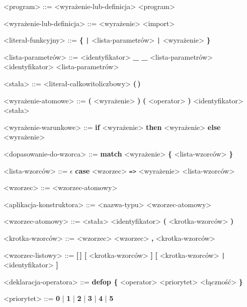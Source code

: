 \documentclass[12pt]{article}
\begin{document}
\begin{grammar}

<program> ::=
    <wyrażenie-lub-definicja>
     <program>

<wyrażenie-lub-definicja> ::=
    <wyrażenie>
    \alt <import>

<literał-funkcyjny> ::=
    \textbf{\{} \texttt{|} <lista-parametrów> \texttt{|} <wyrażenie> \textbf{\}}

<lista-parametrów> ::=
    <identyfikator>
    \alt \textbf{_}
    \alt \textbf{_} <lista-parametrów>
    \alt <identyfikator> <lista-parametrów>

<stała> ::=
    <literał-całkowitoliczbowy>
    \alt \textbf{(\,)}

<wyrażenie-atomowe> ::=
    \textbf{(} <wyrażenie> \textbf{)}
    \textbf{(} <operator> \textbf{)}
    \alt <identyfikator>
    \alt <stała>

<wyrażenie-warunkowe> ::=
    \textbf{if} <wyrażenie>
    \textbf{then} <wyrażenie>
    \textbf{else} <wyrażenie>

<dopasowanie-do-wzorca> ::=
    \textbf{match} <wyrażenie> \textbf{\{}
    <lista-wzorców> \textbf{\}}

<lista-wzorców> ::= $\epsilon$
    \alt \textbf{case} <wzorzec> \texttt{=>} <wyrażenie> <lista-wzorców>

<wzorzec> ::=
    <wzorzec-atomowy>

<aplikacja-konstruktora> ::=
    <nazwa-typu> <wzorzec-atomowy>

<wzorzec-atomowy> ::=
    <stała>
    \alt <identyfikator>
    \alt \textbf{(} <krotka-wzorców> \textbf{)}

<krotka-wzorców> ::=
    <wzorzec>
    \alt <wzorzec> \textbf{,} <krotka-wzorców>

<wzorzec-listowy> ::=
    \textbf{[\,]}
    \alt \textbf{[} <krotka-wzorców> \textbf{]}
    \alt \textbf{[} <krotka-wzorców> \texttt{|} <identyfikator> \textbf{]}

<deklaracja-operatora> ::=
    \textbf{defop \{} <operator> <priorytet> <łączność> \textbf{\}}

<priorytet> ::=
    \textbf{0} | \textbf{1} | \textbf{2} | \textbf{3} | \textbf{4} | \textbf{5}


\end{grammar}
\end{document}
